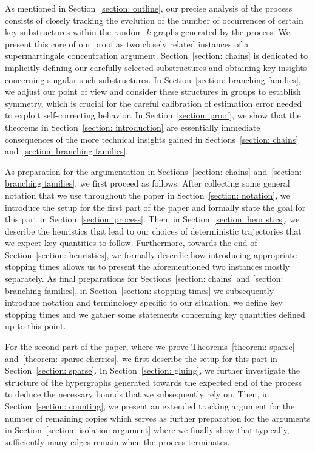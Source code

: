 \documentclass[11pt]{amsart}
\theoremstyle{definition}
\numberwithin{equation}{section}
\begin{document}
	
	As mentioned in Section~\ref{section: outline}, our precise analysis of the process consists of closely tracking the evolution of the number of occurrences of certain key substructures within the random~$k$-graphs generated by the process.
	We present this core of our proof as two closely related instances of a supermartingale concentration argument.
	Section~\ref{section: chains} is dedicated to implicitly defining our carefully selected substructures and obtaining key insights concerning singular such substructures.
	In Section~\ref{section: branching families}, we adjust our point of view and consider these structures in groups to establish symmetry, which is crucial for the careful calibration of estimation error needed to exploit self-correcting behavior.
	In Section~\ref{section: proof}, we show that the theorems in Section~\ref{section: introduction} are essentially immediate consequences of the more technical insights gained in Sections~\ref{section: chains} and~\ref{section: branching families}.
	
	
	As preparation for the argumentation in Sections~\ref{section: chains} and~\ref{section: branching families}, we first proceed as follows.
	After collecting some general notation that we use throughout the paper in Section~\ref{section: notation}, we introduce the setup for the first part of the paper and formally state the goal for this part in Section~\ref{section: process}.
	Then, in Section~\ref{section: heuristics}, we describe the heuristics that lead to our choices of deterministic trajectories that we expect key quantities to follow.
	Furthermore, towards the end of Section~\ref{section: heuristics}, we formally describe how introducing appropriate stopping times allows us to present the aforementioned two instances mostly separately.
	As final preparations for Sections~\ref{section: chains} and \ref{section: branching families}, in Section~\ref{section: stopping times} we subsequently introduce notation and terminology specific to our situation, we define key stopping times and we gather some statements concerning key quantities defined up to this point.
	
	For the second part of the paper, where we prove Theorems~\ref{theorem: sparse} and~\ref{theorem: sparse cherries}, we first describe the setup for this part in Section~\ref{section: sparse}.
	In Section~\ref{section: gluing}, we further investigate the structure of the hypergraphs generated towards the expected end of the process to deduce the necessary bounds that we subsequently rely on.
	Then, in Section~\ref{section: counting}, we present an extended tracking argument for the number of remaining copies which serves as further preparation for the arguments in Section~\ref{section: isolation argument} where we finally show that typically, sufficiently many edges remain when the process terminates.
\end{document}

